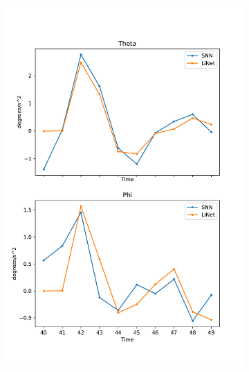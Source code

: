 \documentclass [MS] {UCLAthesis}
\begin{document}
\begin{figure}
\begin{subfigure}[b]{0.2\textwidth}
        \caption{}
        \label{fig:saccade_human_acc_normal}
    \end{subfigure}
    \hfill
    \begin{subfigure}[b]{0.2\textwidth}
        \centering
        \includegraphics[width=\textwidth]{saccade_human_acc_delta}
        \caption{}
        \label{fig:saccade_human_acc_delta}
    \end{subfigure}

    \caption[]{}
    \label{fig:saccade_acc}
\end{figure}


\end{document}
